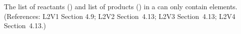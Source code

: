 The list of reactants () and list of products
() in a \Reaction can only contain
 elements.  (References: L2V1 Section 4.9; L2V2
Section~4.13; L2V3 Section~4.13; L2V4 Section~4.13.)
